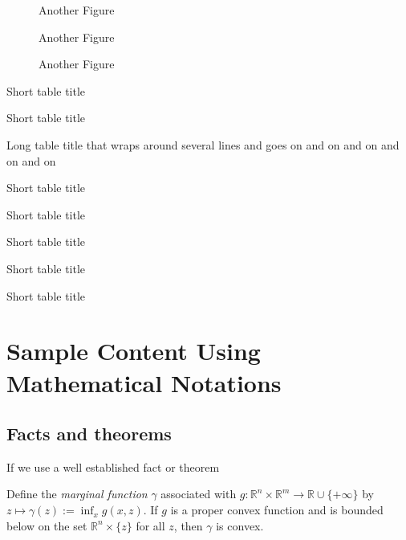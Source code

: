 \documentclass[msc,oneside]{ubcthesis}%
\newcommand{\R}{\mathbb{R}}   %
\begin{document}
\begin{figure}%
\caption{Another Figure}%
\end{figure}

\begin{figure}%
\caption{Another Figure}%
\end{figure}

\begin{figure}%
\caption{Another Figure}%
\end{figure}

\begin{table}
\caption{Short table title}
\end{table}
\begin{table}
\caption{Short table title}
\end{table}
\begin{table}
\caption{Long table title that wraps around several lines and goes on and on and on and on and on}
\end{table}
\begin{table}
\caption{Short table title}
\end{table}
\begin{table}
\caption{Short table title}
\end{table}
\begin{table}
\caption{Short table title}
\end{table}
\begin{table}
\caption{Short table title}
\end{table}
\begin{table}
\caption{Short table title}
\end{table}


\chapter{Sample Content Using Mathematical Notations}

\section{Facts and theorems}
If we use a well established fact or theorem\ 

\begin{fact}\cite[Theorem~IV.2.4.2]{Hiriart-Urruty:1993-ConvexAnalysis}\label{def:marginalfunc}
Define the \emph{marginal function} $\gamma$ associated with $g:\R^n\times\R^m\rightarrow \R\cup
\{+\infty\}$ by $z\mapsto \gamma(z):=\inf_x
g(x,z)$. If $g$ is a proper convex function and is bounded below on the set  $\R^n \times \{z\}$ for all $z$, then $\gamma$ is convex.
\end{fact}
\end{document}
